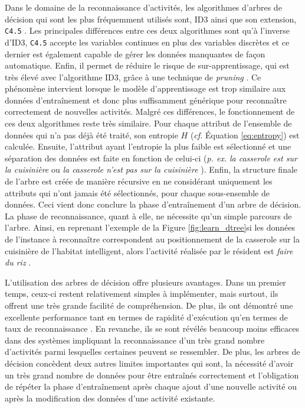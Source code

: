 Dans le domaine de la reconnaissance d'activités, les algorithmes d'arbres de décision qui sont les plus fréquemment utilisés sont, \ac{ID3} ainsi que son extension, \texttt{C4.5} \citep{QuinlanRoss1993}. Les principales différences entre ces deux algorithmes sont qu'à l'inverse d'\acs{ID3}, \texttt{C4.5} accepte les variables continues en plus des variables discrètes et ce dernier est également capable de gérer les données manquantes de façon automatique. Enfin, il permet de réduire le risque de sur-apprentissage, qui est très élevé avec l'algorithme \acs{ID3}, grâce à une technique de \textit{pruning} \citep{Bao2004, Ravi2005, Tapia2007}. Ce phénomène intervient lorsque le modèle d'apprentissage est trop similaire aux données d'entraînement et donc plus suffisamment générique pour reconnaître correctement de nouvelles activités. Malgré ces différences, le fonctionnement de ces deux algorithmes reste très similaire. Pour chaque attribut de l'ensemble de données qui n'a pas déjà été traité, son entropie $H$ (\textit{cf. } Équation \ref{eq:entropy}) est calculée. Ensuite, l'attribut ayant l'entropie la plus faible est sélectionné et une séparation des données est faite en fonction de celui-ci (\textit{p. ex.} \og \textit{la casserole est sur la cuisinière} \fg ou \og \textit{la casserole n'est pas sur la cuisinière} \fg). Enfin, la structure finale de l'arbre est créée de manière récursive en ne considérant uniquement les attributs qui n'ont jamais été sélectionnés, pour chaque sous-ensemble de données. Ceci vient donc conclure la phase d'entraînement d'un arbre de décision. La phase de reconnaissance, quant à elle, ne nécessite qu'un simple parcours de l'arbre. Ainsi, en reprenant l'exemple de la Figure \ref{fig:learn_dtree}\textemdash si les données de l'instance à reconnaître correspondent au positionnement de la casserole sur la cuisinière de l'habitat intelligent, alors l'activité réalisée par le résident est \og \textit{faire du riz} \fg.

L'utilisation des arbres de décision offre plusieurs avantages. Dans un premier temps, ceux-ci restent relativement simples à implémenter, mais surtout, ils offrent une très grande facilité de compréhension. De plus, ils ont démontré une excellente performance tant en termes de rapidité d'exécution qu'en termes de taux de reconnaissance \citep{Bao2004}. En revanche, ils se sont révélés beaucoup moins efficaces dans des systèmes impliquant la reconnaissance d'un très grand nombre d'activités parmi lesquelles certaines peuvent se ressembler. De plus, les arbres de décision concèdent deux autres limites importantes qui sont, la nécessité d'avoir un très grand nombre de données pour être entraînés correctement et l'obligation de répéter la phase d'entraînement après chaque ajout d'une nouvelle activité ou après la modification des données d'une activité existante.

